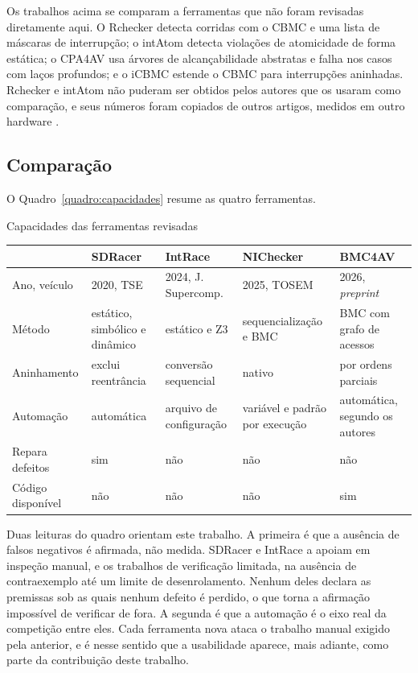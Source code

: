 Os trabalhos acima se comparam a ferramentas que não foram revisadas
diretamente aqui. O Rchecker detecta corridas com o CBMC e uma lista de
máscaras de interrupção; o intAtom detecta violações de atomicidade de forma
estática; o CPA4AV usa árvores de alcançabilidade abstratas e falha nos casos
com laços profundos; e o iCBMC estende o CBMC para interrupções aninhadas.
Rchecker e intAtom não puderam ser obtidos pelos autores que os usaram como
comparação, e seus números foram copiados de outros artigos, medidos em outro
hardware \cite{intrace,nichecker,bmc4av}.

\subsection{Comparação}

O Quadro~\ref{quadro:capacidades} resume as quatro ferramentas.

\begin{quadro}[htb]
  \caption{\label{quadro:capacidades}Capacidades das ferramentas revisadas}
  \small
  \begin{tabular}{|L{2.4cm}|L{2.5cm}|L{2.5cm}|L{3.0cm}|L{2.7cm}|}
    \hline
    & SDRacer & IntRace & NIChecker & BMC4AV \\
    \hline
    Ano, veículo & 2020, TSE & 2024, J. Supercomp. & 2025, TOSEM & 2026, \textit{preprint} \\
    \hline
    Método & estático, simbólico e dinâmico & estático e Z3 & sequencialização e BMC & BMC com grafo de acessos \\
    \hline
    Aninhamento & exclui reentrância & conversão sequencial & nativo & por ordens parciais \\
    \hline
    Automação & automática & arquivo de configuração & variável e padrão por execução & automática, segundo os autores \\
    \hline
    Repara defeitos & sim & não & não & não \\
    \hline
    Código disponível & não & não & não & sim \\
    \hline
  \end{tabular}
\end{quadro}

Duas leituras do quadro orientam este trabalho. A primeira é que a ausência de
falsos negativos é afirmada, não medida. SDRacer e IntRace a apoiam em inspeção
manual, e os trabalhos de verificação limitada, na ausência de contraexemplo
até um limite de desenrolamento. Nenhum deles declara as premissas sob as quais
nenhum defeito é perdido, o que torna a afirmação impossível de verificar de
fora. A segunda é que a automação é o eixo real da competição entre eles. Cada
ferramenta nova ataca o trabalho manual exigido pela anterior, e é nesse sentido
que a usabilidade aparece, mais adiante, como parte da contribuição deste
trabalho.

